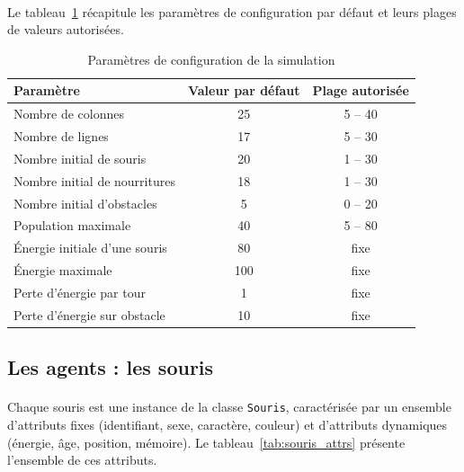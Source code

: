 \paragraph{} Le tableau~\ref{tab:config_spec} récapitule les paramètres de configuration par défaut et leurs plages de valeurs autorisées.

\begin{table}[h!]
\centering
\renewcommand{\arraystretch}{1.4}
\begin{tabular}{|l|c|c|}
\hline
\textbf{Paramètre} & \textbf{Valeur par défaut} & \textbf{Plage autorisée} \\
\hline
Nombre de colonnes & 25 & 5 -- 40 \\
Nombre de lignes & 17 & 5 -- 30 \\
Nombre initial de souris & 20 & 1 -- 30 \\
Nombre initial de nourritures & 18 & 1 -- 30 \\
Nombre initial d'obstacles & 5 & 0 -- 20 \\
Population maximale & 40 & 5 -- 80 \\
Énergie initiale d'une souris & 80 & fixe \\
Énergie maximale & 100 & fixe \\
Perte d'énergie par tour & 1 & fixe \\
Perte d'énergie sur obstacle & 10 & fixe \\
\hline
\end{tabular}
\caption{Paramètres de configuration de la simulation}
\label{tab:config_spec}
\end{table}

\bigskip

\subsection{Les agents : les souris}

\paragraph{} Chaque souris est une instance de la classe \texttt{Souris}, caractérisée par un ensemble d'attributs fixes (identifiant, sexe, caractère, couleur) et d'attributs dynamiques (énergie, âge, position, mémoire). Le tableau~\ref{tab:souris_attrs} présente l'ensemble de ces attributs.

